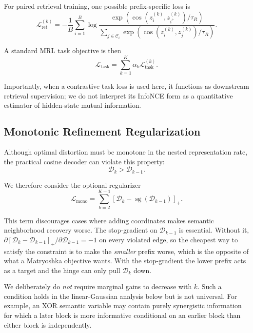 \documentclass[11pt]{article}
\newcommand{\cL}{\mathcal{L}}
\newcommand{\cD}{\mathcal{D}}
\newcommand{\sg}{\operatorname{sg}}
\newcommand{\simcos}{\operatorname{cos}}
\begin{document}
For paired retrieval training, one possible prefix-specific loss is
\begin{equation}
\cL_{\mathrm{ret}}^{(k)}
=
-\frac{1}{B}
\sum_{i=1}^{B}
\log
\frac{
    \exp(
        \simcos(
            z_i^{(k)},
            z_{i^+}^{(k)}
        )/\tau_R
    )
}{
    \sum_{j\in\mathcal C_i}
    \exp(
        \simcos(
            z_i^{(k)},
            z_j^{(k)}
        )/\tau_R
    )
}.
\end{equation}

A standard MRL task objective is then
\begin{equation}
    \cL_{\mathrm{task}}
    =
    \sum_{k=1}^{K}
    \alpha_k
    \cL_{\mathrm{task}}^{(k)}.
\end{equation}

Importantly, when a contrastive task loss is used here, it functions as downstream retrieval supervision; we do not interpret its InfoNCE form as a quantitative estimator of hidden-state mutual information.


\subsection{Monotonic Refinement Regularization}

Although optimal distortion must be monotone in the nested representation rate, the practical cosine decoder can violate this property:
\begin{equation}
    \cD_k > \cD_{k-1}.
\end{equation}

We therefore consider the optional regularizer
\begin{equation}
\boxed{
    \cL_{\mathrm{mono}}
    =
    \sum_{k=2}^{K-1}
    \left[
        \cD_k-\sg(\cD_{k-1})
    \right]_+.
}
\label{eq:mono}
\end{equation}

This term discourages cases where adding coordinates makes semantic neighborhood recovery worse.
The stop-gradient on $\cD_{k-1}$ is essential.
Without it, $\partial[\cD_k-\cD_{k-1}]_+/\partial\cD_{k-1}=-1$ on every violated edge, so the cheapest way to satisfy the constraint is to make the \emph{smaller} prefix worse, which is the opposite of what a Matryoshka objective wants.
With the stop-gradient the lower prefix acts as a target and the hinge can only pull $\cD_k$ down.

We deliberately do \emph{not} require marginal gains to decrease with $k$.
Such a condition holds in the linear-Gaussian analysis below but is not universal.
For example, an XOR semantic variable may contain purely synergistic information for which a later block is more informative conditional on an earlier block than either block is independently.
\end{document}
